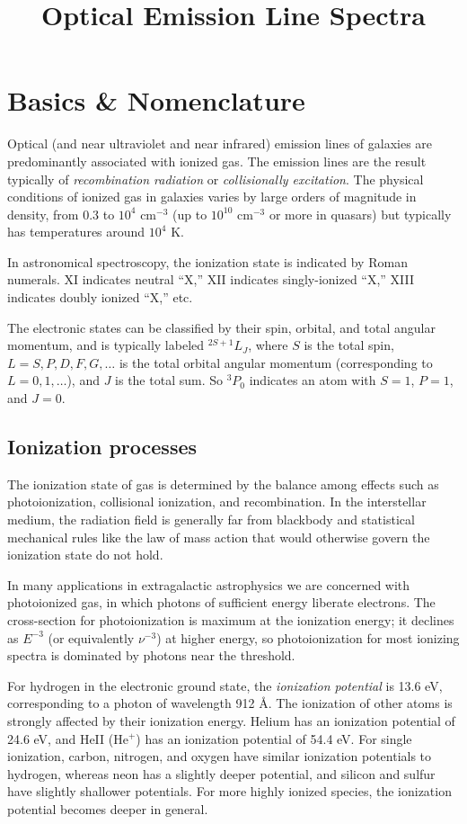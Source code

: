 \title{\bf Optical Emission Line Spectra}

\section{Basics \& Nomenclature}

Optical (and near ultraviolet and near infrared) emission lines of
galaxies are predominantly associated with ionized gas. The emission
lines are the result typically of {\it recombination radiation} or
{\it collisionally excitation}. The physical conditions of ionized gas
in galaxies varies by large orders of magnitude in density, from 0.3
to $10^4$ cm$^{-3}$ (up to $10^{10}$ cm$^{-3}$ or more in quasars) but
typically has temperatures around $10^4$ K.

In astronomical spectroscopy, the ionization state is indicated by
Roman numerals. XI indicates neutral ``X,'' XII indicates
singly-ionized ``X,'' XIII indicates doubly ionized ``X,'' etc.

The electronic states can be classified by their spin, orbital, and
total angular momentum, and is typically labeled ${}^{2S+1}L_J$, where $S$
is the total spin, $L=S, P, D, F, G, \ldots$ is the total orbital
angular momentum (corresponding to $L=0,1,\ldots$), and $J$ is the
total sum. So ${}^3P_0$ indicates an atom with $S=1$, $P=1$, and
$J=0$.

\subsection{Ionization processes}

The ionization state of gas is determined by the balance among effects
such as photoionization, collisional ionization, and recombination. In
the interstellar medium, the radiation field is generally far from
blackbody and statistical mechanical rules like the law of mass action
that would otherwise govern the ionization state do not hold.

In many applications in extragalactic astrophysics we are concerned
with photoionized gas, in which photons of sufficient energy liberate
electrons. The cross-section for photoionization is maximum at the
ionization energy; it declines as $E^{-3}$ (or equivalently
$\nu^{-3}$) at higher energy, so photoionization for most ionizing
spectra is dominated by photons near the threshold.

For hydrogen in the electronic ground state, the {\it ionization
potential} is 13.6 eV, corresponding to a photon of wavelength
912 \AA. The ionization of other atoms is strongly affected by their
ionization energy. Helium has an ionization potential of 24.6 eV, and
HeII (He$^+$) has an ionization potential of 54.4 eV. For single
ionization, carbon, nitrogen, and oxygen have similar ionization
potentials to hydrogen, whereas neon has a slightly deeper potential,
and silicon and sulfur have slightly shallower potentials. For more
highly ionized species, the ionization potential becomes deeper in
general. 

